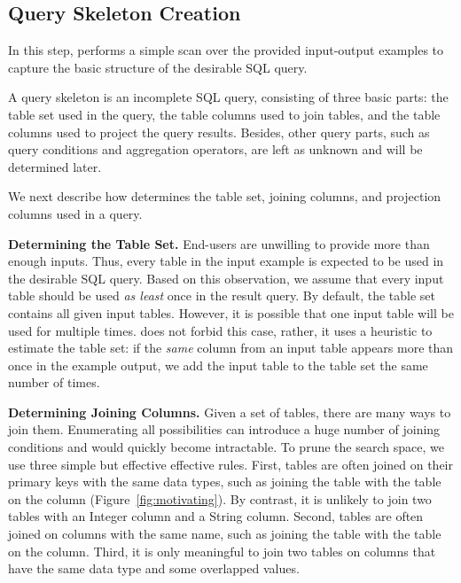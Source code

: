 \subsection{Query Skeleton Creation}
\label{sec:skeleton}


In this step, \ourtool performs a simple scan over
the provided input-output examples to capture the basic
structure of the desirable SQL query.

A query skeleton is an incomplete SQL query, consisting
of three basic parts: the table set used in the query, 
the table columns used to join tables, and the table
columns used to project the query results. Besides,
other query parts, such as query conditions and
aggregation operators, are left as unknown and will be
determined later. 

We next describe how \ourtool determines the table set,
joining columns, and projection columns used in a query.



\vspace{1mm}
{\textbf{Determining the Table Set.}} 
End-users are unwilling to provide more than enough
inputs. Thus, every table in the input example
is expected to be used in the desirable SQL query.
Based on this observation, we assume that every input table
should be used \textit{as least} once in the result query. 
By default, the table set contains all given input tables.
However, it is possible that one input table will be
used for multiple times.
\ourtool does not forbid this case,
rather, it uses a heuristic
to estimate the table set: if the \textit{same} column from
an input table appears more than once in the
example output, we add the input table to the table set the same
number of times.



{\textbf{Determining Joining Columns. }} Given a set of tables,
there are many ways to join them. Enumerating all possibilities can
introduce a huge number of joining conditions and would quickly
become intractable. To prune the search space, we use
three simple but effective effective rules. 
First, tables are often joined on their primary keys with
the same data types, such as joining the  table with
the  table on the  column (Figure~\ref{fig:motivating}).
By contrast, it is unlikely to join two tables with an
Integer column and a String column. Second, tables are often joined
on columns with the same name, such as joining the  table
with the  table on the
 column. Third, it is only meaningful
to join two tables on columns that have the same data type and some
overlapped values. 

